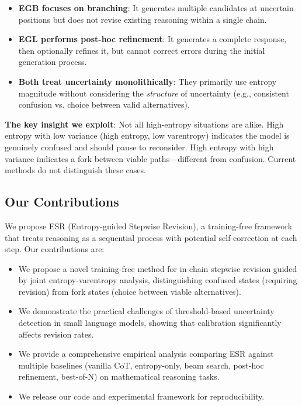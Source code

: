\documentclass{article}
\begin{document}
\begin{itemize}
    \item \textbf{EGB focuses on branching}: It generates multiple candidates at uncertain positions but does not revise existing reasoning within a single chain.
    \item \textbf{EGL performs post-hoc refinement}: It generates a complete response, then optionally refines it, but cannot correct errors during the initial generation process.
    \item \textbf{Both treat uncertainty monolithically}: They primarily use entropy magnitude without considering the \textit{structure} of uncertainty (e.g., consistent confusion vs. choice between valid alternatives).
\end{itemize}

\textbf{The key insight we exploit}: Not all high-entropy situations are alike. High entropy with low variance (high entropy, low varentropy) indicates the model is genuinely confused and should pause to reconsider. High entropy with high variance indicates a fork between viable paths---different from confusion. Current methods do not distinguish these cases.

\subsection{Our Contributions}

We propose ESR (Entropy-guided Stepwise Revision), a training-free framework that treats reasoning as a sequential process with potential self-correction at each step. Our contributions are:

\begin{itemize}
    \item We propose a novel training-free method for in-chain stepwise revision guided by joint entropy-varentropy analysis, distinguishing confused states (requiring revision) from fork states (choice between viable alternatives).
    \item We demonstrate the practical challenges of threshold-based uncertainty detection in small language models, showing that calibration significantly affects revision rates.
    \item We provide a comprehensive empirical analysis comparing ESR against multiple baselines (vanilla CoT, entropy-only, beam search, post-hoc refinement, best-of-N) on mathematical reasoning tasks.
    \item We release our code and experimental framework for reproducibility.
\end{itemize}
\end{document}
